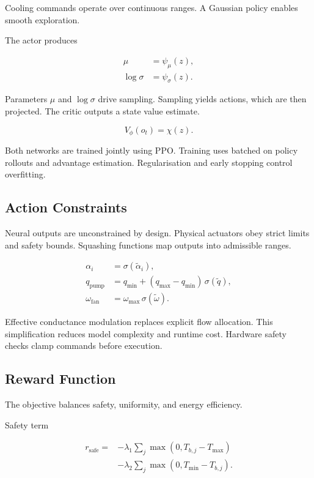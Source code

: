 \documentclass{article}
\begin{document}
Cooling commands operate over continuous ranges.
A Gaussian policy enables smooth exploration.

The actor produces

\begin{align}
\mu &= \psi_{\mu}(z),\\
\log \sigma &= \psi_{\sigma}(z).
\end{align}

Parameters \(\mu\) and \(\log \sigma\) drive sampling.
Sampling yields actions, which are then projected.
The critic outputs a state value estimate.

\begin{equation}
V_{\phi}(o_t) = \chi(z).
\end{equation}

Both networks are trained jointly using PPO\@.
Training uses batched on policy rollouts and advantage estimation.
Regularisation and early stopping control overfitting.

\subsection{Action Constraints}

Neural outputs are unconstrained by design.
Physical actuators obey strict limits and safety bounds.
Squashing functions map outputs into admissible ranges.

\begin{align}
\alpha_i &= \sigma(\tilde \alpha_i),\\
q_{\mathrm{pump}} &=
q_{\min} + (q_{\max}-q_{\min})\,\sigma(\tilde q),\\
\omega_{\mathrm{fan}} &=
\omega_{\max}\,\sigma(\tilde \omega).
\end{align}

Effective conductance modulation replaces explicit flow allocation.
This simplification reduces model complexity and runtime cost.
Hardware safety checks clamp commands before execution.

\subsection{Reward Function}

The objective balances safety, uniformity, and energy efficiency.

Safety term

\begin{equation}
\begin{aligned}
r_{\mathrm{safe}} ={}&
-\lambda_1 \sum_j \max(0,T_{b,j}-T_{\max}) \\
&-\lambda_2 \sum_j \max(0,T_{\min}-T_{b,j}).
\end{aligned}
\end{equation}
\end{document}
